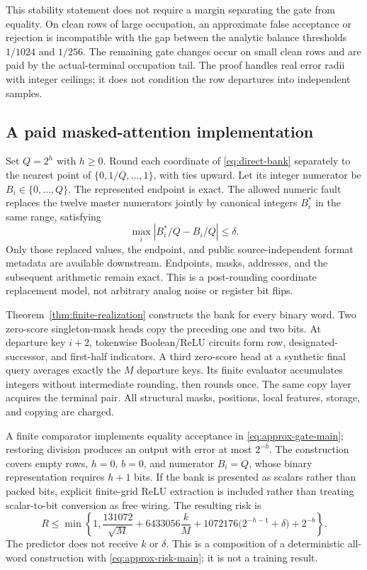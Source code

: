This stability statement does not require a margin separating the gate from equality. On clean rows of large occupation, an approximate false acceptance or rejection is incompatible with the gap between the analytic balance thresholds $1/1024$ and $1/256$. The remaining gate changes occur on small clean rows and are paid by the actual-terminal occupation tail. The proof handles real error radii with integer ceilings; it does not condition the row departures into independent samples.

\subsection{A paid masked-attention implementation}
Set $Q=2^h$ with $h\ge0$. Round each coordinate of \eqref{eq:direct-bank} separately to the nearest point of $\{0,1/Q,\ldots,1\}$, with ties upward. Let its integer numerator be $B_i\in\{0,\ldots,Q\}$. The represented endpoint is exact. The allowed numeric fault replaces the twelve master numerators jointly by canonical integers $B_i^*$ in the same range, satisfying
\[
 \max_i |B_i^*/Q-B_i/Q|\le\delta.
\]
Only those replaced values, the endpoint, and public source-independent format metadata are available downstream. Endpoints, masks, addresses, and the subsequent arithmetic remain exact. This is a post-rounding coordinate replacement model, not arbitrary analog noise or register bit flips.

Theorem~\ref{thm:finite-realization} constructs the bank for every binary word. Two zero-score singleton-mask heads copy the preceding one and two bits. At departure key $i+2$, tokenwise Boolean/ReLU circuits form row, designated-successor, and first-half indicators. A third zero-score head at a synthetic final query averages exactly the $M$ departure keys. Its finite evaluator accumulates integers without intermediate rounding, then rounds once. The same copy layer acquires the terminal pair. All structural masks, positions, local features, storage, and copying are charged.

A finite comparator implements equality acceptance in \eqref{eq:approx-gate-main}; restoring division produces an output with error at most $2^{-b}$. The construction covers empty rows, $h=0$, $b=0$, and numerator $B_i=Q$, whose binary representation requires $h+1$ bits. If the bank is presented as scalars rather than packed bits, explicit finite-grid ReLU extraction is included rather than treating scalar-to-bit conversion as free wiring. The resulting risk is
\begin{equation}\label{eq:finite-realization-main}
 R\le\min\left\{1,\frac{131072}{\sqrt M}+6433056\frac{k}{M}
      +1072176\bigl(2^{-h-1}+\delta\bigr)+2^{-b}\right\}.
\end{equation}
The predictor does not receive $k$ or $\delta$. This is a composition of a deterministic all-word construction with \eqref{eq:approx-risk-main}; it is not a training result.

